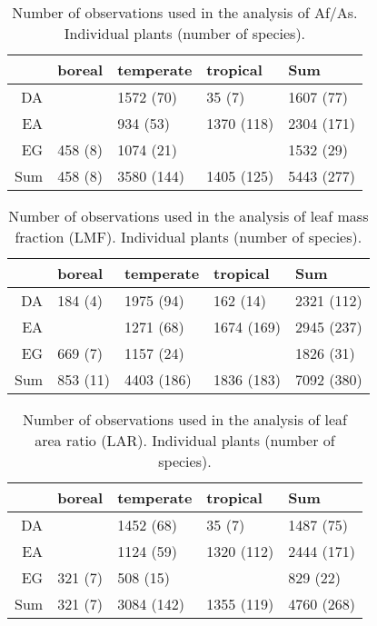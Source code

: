 \documentclass[a4paper]{article}\usepackage[]{graphicx}\usepackage[]{color}
\begin{document}
\begin{table}[ht]
\centering
\caption{Number of observations used in the analysis of Af/As. Individual plants (number of species).} 
\begin{tabular}{rlll|l}
  & boreal & temperate & tropical & Sum \\ 
  \hline
DA &  & 1572 (70) & 35 (7) & 1607 (77) \\ 
  EA &  & 934 (53) & 1370 (118) & 2304 (171) \\ 
  EG & 458 (8) & 1074 (21) &  & 1532 (29) \\ 
   \hline
Sum & 458 (8) & 3580 (144) & 1405 (125) & 5443 (277) \\ 
  \end{tabular}
\end{table}



\begin{table}[ht]
\centering
\caption{Number of observations used in the analysis of leaf mass fraction (LMF). Individual plants (number of species).} 
\begin{tabular}{rlll|l}
  & boreal & temperate & tropical & Sum \\ 
  \hline
DA & 184 (4) & 1975 (94) & 162 (14) & 2321 (112) \\ 
  EA &  & 1271 (68) & 1674 (169) & 2945 (237) \\ 
  EG & 669 (7) & 1157 (24) &  & 1826 (31) \\ 
   \hline
Sum & 853 (11) & 4403 (186) & 1836 (183) & 7092 (380) \\ 
  \end{tabular}
\end{table}



\begin{table}[ht]
\centering
\caption{Number of observations used in the analysis of leaf area ratio (LAR). Individual plants (number of species).} 
\begin{tabular}{rlll|l}
  & boreal & temperate & tropical & Sum \\ 
  \hline
DA &  & 1452 (68) & 35 (7) & 1487 (75) \\ 
  EA &  & 1124 (59) & 1320 (112) & 2444 (171) \\ 
  EG & 321 (7) & 508 (15) &  & 829 (22) \\ 
   \hline
Sum & 321 (7) & 3084 (142) & 1355 (119) & 4760 (268) \\ 
  \end{tabular}
\end{table}






\clearpage

\end{document}
